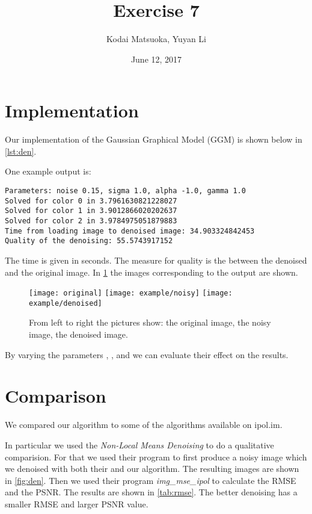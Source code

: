 \documentclass[12pt]{scrartcl}
\author{Kodai Matsuoka, Yuyan Li}
\title{Exercise 7}
\date{June 12, 2017}
\begin{document}
\maketitle

\section{Implementation}

Our implementation of the Gaussian Graphical Model (GGM) is shown below in \cref{lst:den}.

One example output is:

\begin{verbatim}
Parameters: noise 0.15, sigma 1.0, alpha -1.0, gamma 1.0
Solved for color 0 in 3.7961630821228027
Solved for color 1 in 3.9012866020202637
Solved for color 2 in 3.9784975051879883
Time from loading image to denoised image: 34.903324842453
Quality of the denoising: 55.5743917152
\end{verbatim}

The time is given in seconds. The measure for quality is the  between the denoised and the original image.
In \cref{fig:ex} the images corresponding to the output are shown.

\begin{figure}
  \centering
  \texttt{[image: original]}
  \texttt{[image: example/noisy]}
  \texttt{[image: example/denoised]}
  \label{fig:ex}
  \caption{From left to right the pictures show: the original image, the noisy image, the denoised image.}
\end{figure}

By varying the parameters , ,  and  we can evaluate their effect on the results.


\section{Comparison}

We compared our algorithm to some of the algorithms available on ipol.im.

In particular we used the \emph{Non-Local Means Denoising} to do a qualitative comparision. For that we used their program to first produce a noisy image which we denoised with both their and our algorithm. The resulting images are shown in \cref{fig:den}. Then we used their program \emph{img\_mse\_ipol} to calculate the RMSE and the PSNR. The results are shown in \cref{tab:rmse}. The better denoising has a smaller RMSE and larger PSNR value.
\end{document}
